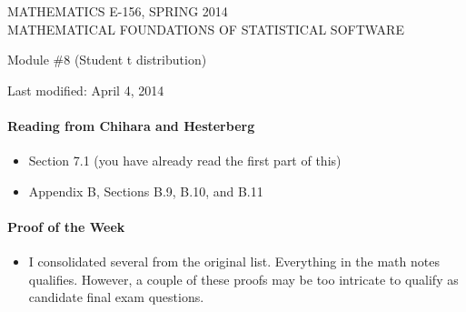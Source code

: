 \documentclass[12pt]{article}
\begin{document}
\begin{center}
MATHEMATICS E-156, SPRING 2014 \\
MATHEMATICAL FOUNDATIONS OF STATISTICAL SOFTWARE

\smallskip

Module \#8 (Student t distribution)
\end{center}

Last modified: April 4, 2014

\medskip

\paragraph*{Reading from Chihara and Hesterberg}

\begin{itemize}
\item Section 7.1 (you have already read the first part of this)

\item Appendix B, Sections B.9, B.10, and B.11
\end{itemize}


\paragraph*{Proof of the Week}
\begin{itemize}
\item I consolidated several from the original list. Everything in the math notes qualifies. However, a couple of these proofs may be too intricate to qualify as candidate final exam questions.
\end{itemize}

\pagebreak
\end{document}
